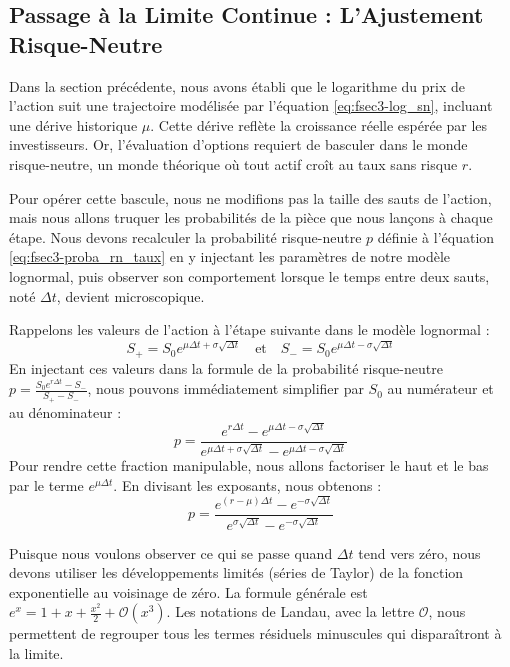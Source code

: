 \subsection{Passage à la Limite Continue : L'Ajustement Risque-Neutre}

Dans la section précédente, nous avons établi que le logarithme du prix de l'action suit une trajectoire modélisée par l'équation \ref{eq:fsec3-log_sn}, incluant une dérive historique $\mu$. Cette dérive reflète la croissance réelle espérée par les investisseurs. Or, l'évaluation d'options requiert de basculer dans le monde risque-neutre, un monde théorique où tout actif croît au taux sans risque $r$. 

Pour opérer cette bascule, nous ne modifions pas la taille des sauts de l'action, mais nous allons truquer les probabilités de la pièce que nous lançons à chaque étape. Nous devons recalculer la probabilité risque-neutre $p$ définie à l'équation \ref{eq:fsec3-proba_rn_taux} en y injectant les paramètres de notre modèle lognormal, puis observer son comportement lorsque le temps entre deux sauts, noté $\Delta t$, devient microscopique.

Rappelons les valeurs de l'action à l'étape suivante dans le modèle lognormal :
\begin{equation}
    \label{eq:fsec3-up_down_lognormal}
    S_+ = S_0 e^{\mu \Delta t + \sigma \sqrt{\Delta t}} \quad \text{et} \quad S_- = S_0 e^{\mu \Delta t - \sigma \sqrt{\Delta t}}
\end{equation}
En injectant ces valeurs dans la formule de la probabilité risque-neutre $p = \frac{S_0 e^{r\Delta t} - S_-}{S_+ - S_-}$, nous pouvons immédiatement simplifier par $S_0$ au numérateur et au dénominateur :
\begin{equation}
    \label{eq:fsec3-p_brut}
    p = \frac{e^{r\Delta t} - e^{\mu \Delta t - \sigma \sqrt{\Delta t}}}{e^{\mu \Delta t + \sigma \sqrt{\Delta t}} - e^{\mu \Delta t - \sigma \sqrt{\Delta t}}}
\end{equation}
Pour rendre cette fraction manipulable, nous allons factoriser le haut et le bas par le terme $e^{\mu \Delta t}$. En divisant les exposants, nous obtenons :
\begin{equation}
    \label{eq:fsec3-p_factorise}
    p = \frac{e^{(r-\mu)\Delta t} - e^{-\sigma \sqrt{\Delta t}}}{e^{\sigma \sqrt{\Delta t}} - e^{-\sigma \sqrt{\Delta t}}}
\end{equation}

Puisque nous voulons observer ce qui se passe quand $\Delta t$ tend vers zéro, nous devons utiliser les développements limités (séries de Taylor) de la fonction exponentielle au voisinage de zéro. La formule générale est $e^x = 1 + x + \frac{x^2}{2} + \mathcal{O}(x^3)$. Les notations de Landau, avec la lettre $\mathcal{O}$, nous permettent de regrouper tous les termes résiduels minuscules qui disparaîtront à la limite.

